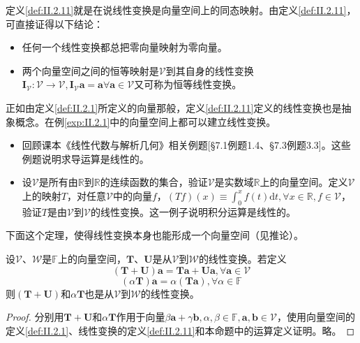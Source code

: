 \documentclass[main.tex]{subfiles}
\begin{document}
定义\ref{def:II.2.11}就是在说线性变换是向量空间上的同态映射。由定义\ref{def:II.2.11}，可直接证得以下结论：
\begin{itemize}
    \item 任何一个线性变换都总把零向量映射为零向量。
    \item 两个向量空间之间的恒等映射是$\mathcal{V}$到其自身的线性变换$\mathbf{I}_\mathcal{V}:\mathcal{V}\rightarrow\mathcal{V},\mathbf{I}_\mathcal{V}\mathbf{a}=\mathbf{a}\forall\mathbf{a}\in\mathcal{V}$又可称为恒等线性变换。
\end{itemize}

正如由定义\ref{def:II.2.1}所定义的向量那般，定义\ref{def:II.2.11}定义的线性变换也是抽象概念。在例\ref{exp:II.2.1}中的向量空间上都可以建立线性变换。

\begin{example}\label{exp:II.2.9}
    \begin{itemize}
        \item 回顾课本《线性代数与解析几何》相关例题\cite{周胜林2012线性代数}[\S 7.1例题1.4、\S 7.3例题3.3]。这些例题说明求导运算是线性的。
        \item 设$\mathcal{V}$是所有由$\mathbb{R}$到$\mathbb{R}$的连续函数的集合，验证$\mathcal{V}$是实数域$\mathbb{R}$上的向量空间。定义$\mathcal{V}$上的映射$T$，对任意$\mathcal{V}$中的向量$f$，$\left(Tf\right)\left(x\right)\equiv\int_0^x f\left(t\right)\mathrm{d}t,\forall x\in\mathbb{R},f\in\mathcal{V}$，验证$T$是由$\mathcal{V}$到$\mathcal{V}$的线性变换。这一例子说明积分运算是线性的。
    \end{itemize}
\end{example}


下面这个定理，使得线性变换本身也能形成一个向量空间（见推论）。

\begin{theorem}\label{thm:II.2.6}
    设$\mathcal{V}$、$\mathcal{W}$是$\mathbb{F}$上的向量空间，$\mathbf{T}$、$\mathbf{U}$是从$\mathcal{V}$到$\mathcal{W}$的线性变换。若定义
    \[\left(\mathbf{T}+\mathbf{U}\right)\mathbf{a}=\mathbf{Ta}+\mathbf{Ua},\forall\mathbf{a}\in\mathcal{V}\]
    \[\left(\alpha\mathbf{T}\right)\mathbf{a}=\alpha\left(\mathbf{Ta}\right),\forall\alpha\in\mathbb{F}\]
    则$\left(\mathbf{T}+\mathbf{U}\right)$和$\alpha\mathbf{T}$也是从$\mathcal{V}$到$\mathcal{W}$的线性变换。
\end{theorem}
\begin{proof}
    分别用$\mathbf{T}+\mathbf{U}$和$\alpha\mathbf{T}$作用于向量$\beta\mathbf{a}+\gamma\mathbf{b},\alpha,\beta\in\mathbb{F},\mathbf{a},\mathbf{b}\in\mathcal{V}$，使用向量空间的定义\ref{def:II.2.1}、线性变换的定义\ref{def:II.2.11}和本命题中的运算定义证明。略。
\end{proof}
\end{document}
